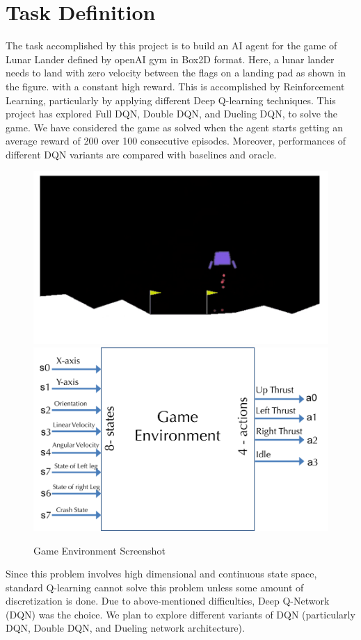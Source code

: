 \section{Task Definition}
\label{intro}

The task accomplished by this project is to build an AI agent for the game of Lunar Lander defined by openAI gym in Box2D format. Here, a lunar lander needs to land with zero velocity between the flags on a landing pad as shown in the figure. with a constant high reward. This is accomplished by Reinforcement Learning, particularly by applying different Deep Q-learning techniques. This project has explored Full DQN\citep{DoubleQ-learning}, Double DQN\citep{DoubleQ-learning}, and Dueling DQN\citep{Dueling}, to solve the game. We have considered the game as solved when the agent starts getting an average reward of 200 over 100 consecutive episodes. Moreover, performances of different DQN variants are compared with baselines and oracle. \\


\begin{figure}[!ht]
\centering
\includegraphics[scale=0.50,width=0.50\columnwidth]{figures/game.png}%
\includegraphics[scale=0.35,width=0.35\columnwidth]{figures/game_env.png}%
\caption{ Game Environment Screenshot}%
\label{fig:Visualization}%
\end{figure}

Since this problem involves high dimensional and continuous state
space, standard Q-learning cannot solve this problem unless some amount of discretization is done. Due to above-mentioned difficulties, Deep Q-Network (DQN) was the choice. We plan to explore different variants of DQN (particularly DQN, Double DQN, and
Dueling network architecture).



